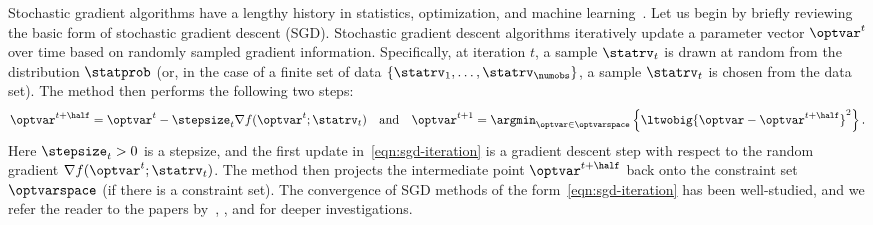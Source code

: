 \documentclass[11pt,twoside]{article}
\theoremstyle{definition}
\begin{document}
Stochastic gradient algorithms have a lengthy history in
statistics, optimization, and machine learning~\citep{RobbinsMo51, PolyakJu92,
  NemirovskiJuLaSh09, RakhlinShSr12}.  Let us begin by briefly
reviewing the basic form of stochastic gradient descent (SGD).
Stochastic gradient descent algorithms iteratively update a parameter
vector $\optvar^t$ over time based on randomly sampled gradient
information. Specifically, at iteration $t$, a sample $\statrv_t$ is
drawn at random from the distribution $\statprob$ (or, in the case of
a finite set of data $\{\statrv_1, \ldots, \statrv_\numobs\}$, a
sample $\statrv_t$ is chosen from the data set). The method then
performs the following two steps:
\begin{equation}
  \optvar^{t + \half} = \optvar^t - \stepsize_t \nabla f(\optvar^t;
  \statrv_t)
  ~~~ \mbox{and} ~~~
  \optvar^{t + 1} = \argmin_{\optvar \in \optvarspace}
  \left\{ \ltwobig{\optvar - \optvar^{t + \half}}^2 \right\}.
  \label{eqn:sgd-iteration}
\end{equation}
Here $\stepsize_t > 0$ is a stepsize, and the first update
in~\eqref{eqn:sgd-iteration} is a gradient descent step with respect to the
random gradient $\nabla f(\optvar^t; \statrv_t)$. The method then projects the
intermediate point $\optvar^{t + \half}$ back onto the constraint set
$\optvarspace$ (if there is a constraint set). The convergence of SGD methods
of the form~\eqref{eqn:sgd-iteration} has been well-studied, and we refer the
reader to the papers by~\citet{PolyakJu92}, \citet{NemirovskiJuLaSh09}, and
\citet{RakhlinShSr12} for deeper investigations.
\end{document}
